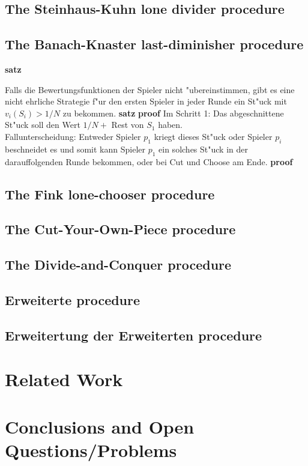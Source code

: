 \subsection{The Steinhaus-Kuhn lone divider procedure}
\newpage
\subsection{The Banach-Knaster last-diminisher procedure}
\textbf{satz}

Falls die Bewertungsfunktionen der Spieler nicht "ubereinstimmen, gibt es eine nicht ehrliche Strategie f"ur den ersten Spieler in jeder Runde ein St"uck mit $v_i(S_i)>1/N$ zu bekommen.
\textbf{satz}
\textbf{proof}
Im Schritt 1: Das abgeschnittene St"uck soll den Wert $1/N+$ Rest von $S_1$ haben.\\
Fallunterscheidung: Entweder Spieler $p_1$ kriegt dieses St"uck oder Spieler $p_i$ beschneidet es und somit kann Spieler $p_1$ ein solches St"uck in der darauffolgenden Runde bekommen, oder bei Cut und Choose am Ende.
\textbf{proof}
\newpage
\subsection{The Fink lone-chooser procedure}
\newpage
\subsection{The Cut-Your-Own-Piece procedure}
\newpage
\subsection{The Divide-and-Conquer procedure}
\newpage
\subsection{Erweiterte procedure}
\newpage
\subsection{Erweitertung der Erweiterten procedure}
\newpage
\section{Related Work}
\pagebreak

\section{Conclusions and Open Questions/Problems}
\pagebreak

